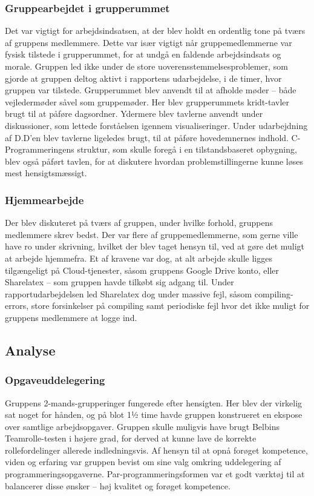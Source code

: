 \subsubsection{Gruppearbejdet i grupperummet} 
Det var vigtigt for arbejdsindsatsen, at der blev holdt en ordentlig tone på tværs af gruppens medlemmere. Dette var især vigtigt når gruppemedlemmerne var fysisk tilstede i grupperummet, for at undgå en faldende arbejdsindsats og morale. Gruppen led ikke under de store uoverensstemmelsesproblemer, som gjorde at gruppen deltog aktivt i rapportens udarbejdelse, i de timer, hvor gruppen var tilstede. Grupperummet blev anvendt til at afholde møder – både vejledermøder såvel som gruppemøder. Her blev grupperummets kridt-tavler brugt til at påføre dagsordner. Ydermere blev tavlerne anvendt under diskussioner, som lettede forståelsen igennem visualiseringer. Under udarbejdning af D.D’en blev tavlerne ligeledes brugt, til at påføre hovedemnernes indhold. C-Programmeringens struktur, som skulle foregå i en tilstandsbaseret opbygning, blev også påført tavlen, for at diskutere hvordan problemstillingerne kunne løses mest hensigtsmæssigt. \\

\subsubsection{Hjemmearbejde}
Der blev diskuteret på tværs af gruppen, under hvilke forhold, gruppens medlemmere skrev bedst. Der var flere af gruppemedlemmerne, som gerne ville have ro under skrivning, hvilket der blev taget hensyn til, ved at gøre det muligt at arbejde hjemmefra. Et af kravene var dog, at alt arbejde skulle ligges tilgængeligt på Cloud-tjenester, såsom gruppens Google Drive konto, eller Sharelatex – som gruppen havde tilkøbt sig adgang til. Under rapportudarbejdelsen led Sharelatex dog under massive fejl, såsom compiling-errors, store forsinkelser på compiling samt periodiske fejl hvor det ikke muligt for gruppens medlemmere at logge ind. 

\subsection{Analyse}
\subsubsection{Opgaveuddelegering} 
Gruppens 2-mands-grupperinger fungerede efter hensigten. Her blev der virkelig sat noget for hånden, og på blot 1½ time havde gruppen konstrueret en ekspose over samtlige arbejdsopgaver. Gruppen skulle muligvis have brugt Belbins Teamrolle-testen i højere grad, for derved at kunne lave de korrekte rollefordelinger allerede indledningsvis. Af hensyn til at opnå forøget kompetence, viden og erfaring var gruppen bevist om sine valg omkring uddelegering af programmeringsopgaverne. Par-programmeringsformen var et godt værktøj til at balancerer disse ønsker – høj kvalitet og forøget kompetence. \\

